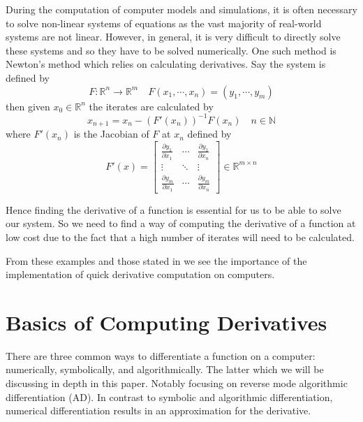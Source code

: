 \documentclass{article}
\begin{document}
During the computation of computer models and simulations, it is often necessary to solve non-linear systems of equations as the vast majority of real-world systems are not linear. However, in general, it is very difficult to directly solve these systems and so they have to be solved numerically. One such method is Newton's method which relies on calculating derivatives. Say the system is defined by
\begin{equation} \label{Fxy}
        F: \mathbb{R}^n \rightarrow \mathbb{R}^m \quad F(x_1, \cdots, x_n) = (y_1, \cdots, y_m)
\end{equation}
then given $x_0 \in \mathbb{R}^n$ the iterates are calculated by
\begin{equation}
x_{n+1} = x_n - (F'(x_n))^{-1}F(x_n) \quad n \in \mathbb{N}
\end{equation}
where $F'(x_n)$ is the Jacobian of $F$ at $x_n$ defined by
\begin{equation} \label{jacobian}
    F'(x) = \begin{bmatrix}
        \frac{\partial y_1}{\partial x_1} & \cdots & \frac{\partial y_1}{\partial x_n} \\
        \vdots & \ddots & \vdots \\
        \frac{\partial y_m}{\partial x_1} & \cdots & \frac{\partial y_m}{\partial x_n}
    \end{bmatrix} \in \mathbb{R}^{m \times n}
\end{equation}

Hence finding the derivative of a function is essential for us to be able to solve our system. So we need to find a way of computing the derivative of a function at low cost due to the fact that a high number of iterates will need to be calculated.

From these examples and those stated in \cite{appad} we see the importance of the implementation of quick derivative computation on computers.

\section{Basics of Computing Derivatives}

There are three common ways to differentiate a function on a computer: numerically, symbolically, and algorithmically. The latter which we will be discussing in depth in this paper. Notably focusing on reverse mode algorithmic differentiation (AD). In contrast to symbolic and algorithmic differentiation, numerical differentiation results in an approximation for the derivative.
\end{document}
